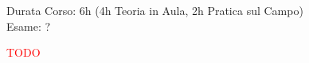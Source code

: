 \documentclass[../uefaC.tex]{subfiles}
\begin{document}

Durata Corso: 6h (4h Teoria in Aula, 2h Pratica sul Campo) \hfill \\
Esame: ?

\textcolor{red}{TODO}
\end{document}
